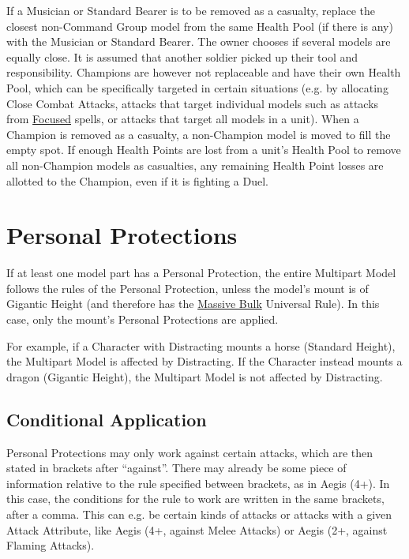 If a Musician or Standard Bearer is to be removed as a casualty, replace the closest non-Command Group \rnf{} model from the same Health Pool (if there is any) with the Musician or Standard Bearer. The owner chooses if several \rnf{} models are equally close. It is assumed that another soldier picked up their tool and responsibility. Champions are however not replaceable and have their own Health Pool, which can be specifically targeted in certain situations (e.g. by allocating Close Combat Attacks, attacks that target individual models such as attacks from \hyperref[focused]{Focused} spells, or attacks that target all models in a unit). When a Champion is removed as a casualty, a non-Champion \rnf{} model is moved to fill the empty spot. If enough Health Points are lost from a unit's Health Pool to remove all non-Champion \rnf{} models as casualties, any remaining Health Point losses are allotted to the Champion, even if it is fighting a Duel.

\section{Personal Protections}
\idx[main=y]{\personalprotections}\label{personal_protections}

If at least one model part has a Personal Protection, the entire Multipart Model follows the rules of the Personal Protection, unless the model's mount is of Gigantic Height (and therefore has the \hyperref[massive_bulk]{Massive Bulk} Universal Rule). In this case, only the mount's Personal Protections are applied.

For example, if a Character with Distracting mounts a horse (Standard Height), the Multipart Model is affected by Distracting. If the Character instead mounts a dragon (Gigantic Height), the Multipart Model is not affected by Distracting.

\subsection{Conditional Application}
\label{PP_conditional_application}

Personal Protections may only work against certain attacks, which are then stated in brackets after \enquote{against}. There may already be some piece of information relative to the rule specified between brackets, as in Aegis (4+). In this case, the conditions for the rule to work are written in the same brackets, after a comma. This can e.g. be certain kinds of attacks or attacks with a given Attack Attribute, like Aegis (4+, against Melee Attacks) or Aegis (2+, against Flaming Attacks).

